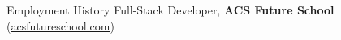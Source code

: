 \begin{rubric}{Employment History}
%
	Full-Stack Developer, \textbf{ACS Future School} (\href{https://www.acsfutureschool.com}{acsfutureschool.com})

\end{rubric}